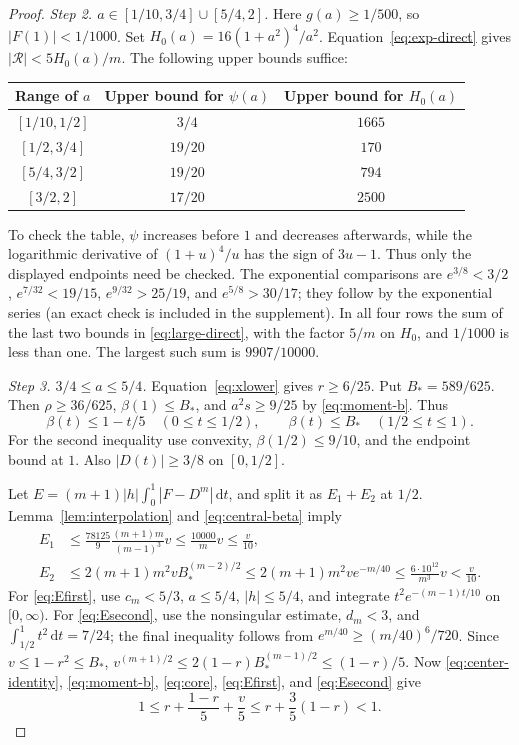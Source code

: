 \documentclass[11pt,reqno]{amsart}
\theoremstyle{definition}
\theoremstyle{remark}
\numberwithin{equation}{section}
\newcommand{\dd}{\,\mathrm d}
\newcommand{\step}[1]{\par\smallskip\noindent\emph{#1}\enspace}
\begin{document}
\begin{proof}
\step{Step 2. $a\in[1/10,3/4]\cup[5/4,2]$.}
Here $g(a)\ge1/500$, so $|F(1)|<1/1000$. Set $H_0(a)=16(1+a^2)^4/a^2$. Equation~\eqref{eq:exp-direct} gives $|\mathcal R|<5H_0(a)/m$. The following upper bounds suffice:
\begin{center}
\begin{tabular}{@{}ccc@{}}
\toprule
Range of $a$ & Upper bound for $\psi(a)$ & Upper bound for $H_0(a)$\\
\midrule
$[1/10,1/2]$ & $3/4$ & $1665$\\
$[1/2,3/4]$ & $19/20$ & $170$\\
$[5/4,3/2]$ & $19/20$ & $794$\\
$[3/2,2]$ & $17/20$ & $2500$\\
\bottomrule
\end{tabular}
\end{center}
To check the table, $\psi$ increases before $1$ and decreases afterwards, while the logarithmic derivative of $(1+u)^4/u$ has the sign of $3u-1$. Thus only the displayed endpoints need be checked. The exponential comparisons are
$e^{3/8}<3/2$, $e^{7/32}<19/15$, $e^{9/32}>25/19$, and $e^{5/8}>30/17$; they follow by the exponential series (an exact check is included in the supplement). In all four rows the sum of the last two bounds in \eqref{eq:large-direct}, with the factor $5/m$ on $H_0$, and $1/1000$ is less than one. The largest such sum is $9907/10000$.

\step{Step 3. $3/4\le a\le5/4$.}
Equation~\eqref{eq:xlower} gives $r\ge6/25$. Put $B_*=589/625$. Then $\rho\ge36/625$, $\beta(1)\le B_*$, and $a^2s\ge9/25$ by \eqref{eq:moment-b}. Thus
\begin{equation}\label{eq:central-beta}
 \beta(t)\le1-t/5\quad(0\le t\le1/2),\qquad
 \beta(t)\le B_*\quad(1/2\le t\le1).
\end{equation}
For the second inequality use convexity, $\beta(1/2)\le9/10$, and the endpoint bound at $1$. Also $|D(t)|\ge3/8$ on $[0,1/2]$.

Let $E=(m+1)|h|\int_0^1|F-D^m|\dd t$, and split it as $E_1+E_2$ at $1/2$. Lemma~\ref{lem:interpolation} and \eqref{eq:central-beta} imply
\begin{align}
 E_1&\le\frac{78125}{9}\frac{(m+1)m}{(m-1)^3}v
       \le\frac{10000}{m}v\le\frac v{10},\label{eq:Efirst}\\
 E_2&\le2(m+1)m^2vB_*^{(m-2)/2}
       \le2(m+1)m^2v e^{-m/40}
       \le\frac{6\cdot10^{12}}{m^3}v<\frac v{10}.\label{eq:Esecond}
\end{align}
For \eqref{eq:Efirst}, use $c_m<5/3$, $a\le5/4$, $|h|\le5/4$, and integrate $t^2e^{-(m-1)t/10}$ on $[0,\infty)$. For \eqref{eq:Esecond}, use the nonsingular estimate, $d_m<3$, and $\int_{1/2}^1t^2\dd t=7/24$; the final inequality follows from $e^{m/40}\ge(m/40)^6/720$.
Since $v\le1-r^2\le B_*$,
$v^{(m+1)/2}\le2(1-r)B_*^{(m-1)/2}\le(1-r)/5$.
Now \eqref{eq:center-identity}, \eqref{eq:moment-b}, \eqref{eq:core}, \eqref{eq:Efirst}, and \eqref{eq:Esecond} give
\[
 1\le r+\frac{1-r}{5}+\frac v5
 \le r+\frac35(1-r)<1.
\]


\end{proof}
\end{document}
